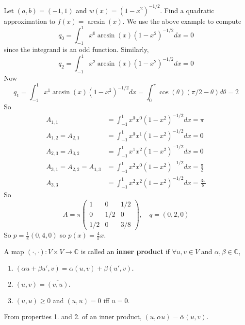 \begin{example}
	Let $(a, b) = (-1, 1)$ and $w(x) = {(1 - x^2)}^{-1/2}$. Find a quadratic approximation to $f(x) = \arcsin(x)$. We use the above example to compute
	\[
		q_0 = \int_{-1}^{1} x^0 \arcsin(x) {(1 - x^2)}^{-1/2} dx = 0
	\]
	since the integrand is an odd function. Similarly,
	\[
		q_2 = \int_{-1}^{1} x^2 \arcsin(x) {(1 - x^2)}^{-1/2} dx = 0
	\]
	Now
	\[
		q_1 = \int_{-1}^{1} x^1 \arcsin(x) {(1 - x^2)}^{-1/2} dx = \int_{0}^{\pi} \cos(\theta) (\pi / 2 - \theta) d\theta = 2
	\]
	So
	\[
		\begin{aligned}
			A_{1, 1} & = \int_{-1}^{1} x^0 x^0 {(1 - x^2)}^{-1/2} dx = \pi \\
			A_{1, 2} = A_{2, 1} & = \int_{-1}^{1} x^0 x^1 {(1 - x^2)}^{-1/2} dx = 0 \\
			A_{2, 3} = A_{3, 2} & = \int_{-1}^{1} x^1 x^2 {(1 - x^2)}^{-1/2} dx = 0 \\
			A_{3, 1} = A_{2, 2} = A_{1, 3} & = \int_{-1}^{1} x^2 x^0 {(1 - x^2)}^{-1/2} dx = \frac{\pi}{2} \\
			A_{3, 3} & = \int_{-1}^{1} x^2 x^2 {(1 - x^2)}^{-1/2} dx = \frac{3 \pi}{8}
		\end{aligned}
	\]
	So
	\[
		A = \pi \begin{pmatrix}
			1 & 0 & 1/2 \\
			0 & 1/2 & 0 \\
			1/2 & 0 & 3/8
		\end{pmatrix},
		\quad q = (0, 2, 0)
	\]
	So $p = \frac{1}{\pi} (0, 4, 0)$ so $p(x) = \frac{4}{\pi} x$.
\end{example}

\begin{definition}
	A map $(\cdot, \cdot): V \times V \rightarrow \mathbb{C}$ is called an \textbf{inner product} if $\forall u, v \in V$ and $\alpha, \beta \in \mathbb{C}$,
	\begin{enumerate}
		\item $(\alpha u + \beta u', v) = \alpha (u, v) + \beta (u', v)$.
		\item $(u, v) = \overline{(v, u)}$.
		\item $(u, u) \geq 0$ and $(u, u) = 0$ iff $u = 0$.
	\end{enumerate}
\end{definition}

\begin{remark}
	From properties 1. and 2. of an inner product, $(u, \alpha u) = \overline{\alpha} (u, v)$.
\end{remark}

